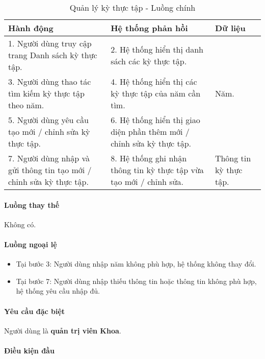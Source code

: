 \documentclass[./../main.tex]{subfiles}
\begin{document}
\begin{table}[H]
  \caption{Quản lý kỳ thực tập - Luồng chính}
  \label{tab:manage_terms}
  \begin{tabularx}{\textwidth}{|X|X|X|}
    \hline
\textbf{Hành động} & \textbf{Hệ thống phản hồi} & \textbf{Dữ liệu} \\ \hline
1. Người dùng truy cập trang Danh sách kỳ thực tập. & 2. Hệ thống hiển thị danh sách các kỳ thực tập. &  \\ \hline
3. Người dùng thao tác tìm kiếm kỳ thực tập theo năm. & 4. Hệ thống hiển thị các kỳ thực tập của năm cần tìm. & Năm. \\ \hline
5. Người dùng yêu cầu tạo mới / chỉnh sửa kỳ thực tập. & 6. Hệ thống hiển thị giao diện phần thêm mới / chỉnh sửa kỳ thực tập. &  \\ \hline
7. Người dùng nhập và gửi thông tin tạo mới / chỉnh sửa kỳ thực tập. & 8. Hệ thống ghi nhận thông tin kỳ thực tập vừa tạo mới / chỉnh sửa. & Thông tin kỳ thực tập. \\ \hline
  \end{tabularx}
\end{table}

\paragraph*{Luồng thay thế} Không có.

\paragraph*{Luồng ngoại lệ}

\begin{itemize}
  \item
    
  Tại bước 3: Người dùng nhập năm không phù hợp, hệ thống không thay đổi.
  
  \item
    
  Tại bước 7: Người dùng nhập thiếu thông tin hoặc thông tin không phù hợp, hệ thống yêu cầu nhập đủ.

\end{itemize}

\paragraph*{Yêu cầu đặc biệt}

Người dùng là \textbf{quản trị viên Khoa}.

\paragraph*{Điều kiện đầu}
\end{document}
